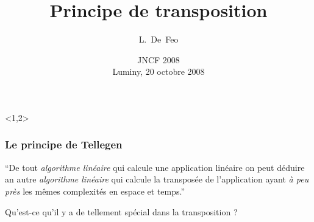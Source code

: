 \documentclass[10pt]{beamer}
\title[Principe de transposition]{Principe de transposition
  \only<1>{et tours d'Artin-Schreier}}
\author{L.~De~Feo}
\institute[LIX]{LIX, École Polytechnique}
\date[JNCF 2008]{JNCF 2008\\ Luminy, 20 octobre 2008}
\begin{document}
\begin{frame}<1,2>
  \titlepage
\end{frame}


\begin{frame}
  \frametitle{Le principe de Tellegen}

  \Large
  \begin{center}
    ``De tout \emph{algorithme linéaire} qui calcule une application
    linéaire on peut déduire an autre \emph{algorithme linéaire} qui
    calcule la transposée de l'application ayant \emph{à peu près} les
    mêmes complexités en espace et temps.''
  \end{center}

  \vfill
  \pause

  \begin{center}
    Qu'est-ce qu'il y a de tellement spécial dans la transposition ?
  \end{center}
\end{frame}
\end{document}
